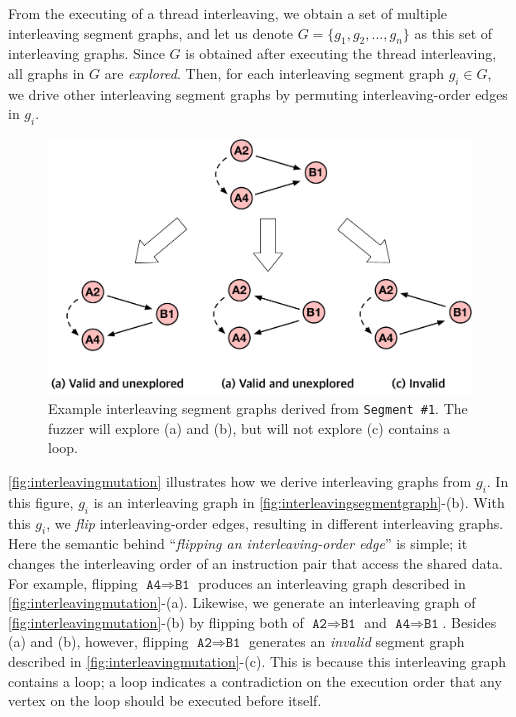 From the executing of a thread interleaving, we obtain a set of
multiple interleaving segment graphs, and let us denote
$G = \{g_1, g_2, ..., g_n \}$ as this set of interleaving graphs.
%
Since $G$ is obtained after executing the thread interleaving, all
graphs in $G$ are \textit{explored}.
%
Then, for each interleaving segment graph $g_i \in G$, we drive other
interleaving segment graphs by permuting interleaving-order edges in
$g_i$.



\begin{figure}[t]
  \centering
  \includegraphics[width=0.9\linewidth]{fig/interleavingmutation.pdf}
  \caption{Example interleaving segment graphs derived from
    \texttt{Segment \#1}. The fuzzer will explore (a) and (b), but
    will not explore (c) contains a loop.}
  \label{fig:interleavingmutation}
\end{figure}
%
\autoref{fig:interleavingmutation} illustrates how we derive
interleaving graphs from $g_i$.
%
In this figure, $g_i$ is an interleaving graph in
\autoref{fig:interleavingsegmentgraph}-(b).
%
With this $g_i$, we \textit{flip} interleaving-order edges, resulting
in different interleaving graphs.
%
Here the semantic behind ``\textit{flipping an interleaving-order
  edge}'' is simple; it changes the interleaving order of an
instruction pair that access the shared data.
%
For example, flipping $\texttt{A4} \Rightarrow \texttt{B1}$ produces
an interleaving graph described in
\autoref{fig:interleavingmutation}-(a).
%
Likewise, we generate an interleaving graph of
\autoref{fig:interleavingmutation}-(b) by flipping both of
$\texttt{A2} \Rightarrow \texttt{B1}$ and
$\texttt{A4} \Rightarrow \texttt{B1}$.
%
%
Besides (a) and (b), however, flipping
$\texttt{A2} \Rightarrow \texttt{B1}$ generates an \textit{invalid}
segment graph described in \autoref{fig:interleavingmutation}-(c).
%
This is because this interleaving graph contains a loop; a loop
indicates a contradiction on the execution order that any vertex on
the loop should be executed before itself.







